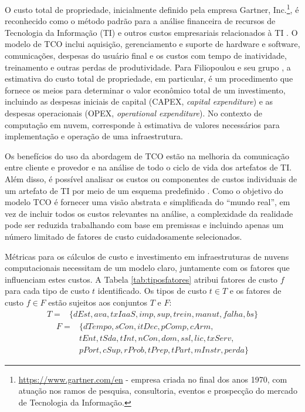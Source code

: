 \documentclass[tese,capa]{texufpel}
\begin{document}
O custo total de propriedade, inicialmente definido pela empresa Gartner, Inc.\footnote{\url{https://www.gartner.com/en} - empresa criada no final dos anos 1970, com atuação nos ramos de pesquisa, consultoria, eventos e prospecção do mercado de Tecnologia da Informação.}, é reconhecido como o método padrão para a análise financeira de recursos de Tecnologia da Informação (TI) e outros custos empresariais relacionados à TI \cite{mieritzDefiningGartnerTotal2005}. O modelo de TCO inclui aquisição, gerenciamento e suporte de hardware e software, comunicações, despesas do usuário final e os custos com tempo de inatividade, treinamento e outras perdas de produtividade. Para Filiopoulou e seu grupo \cite{filiopoulouIntegratingCostAnalysis2015}, a estimativa do custo total de propriedade, em particular, é um procedimento que fornece os meios para determinar o valor econômico total de um investimento, incluindo as despesas iniciais de capital (CAPEX, \emph{capital expenditure}) e as despesas operacionais (OPEX, \emph{operational expenditure}). No contexto de computação em nuvem, corresponde à estimativa de valores necessários para implementação e operação de uma infraestrutura.

Os benefícios do uso da abordagem de TCO estão na melhoria da comunicação entre cliente e provedor e na análise de todo o ciclo de vida dos artefatos de TI. Além disso, é possível analisar os custos ou componentes de custos individuais de um artefato de TI por meio de um esquema predefinido \cite{walterbuschEvaluatingCloudComputing2013}. Como o objetivo do modelo TCO é fornecer uma visão abstrata e simplificada do ``mundo real'', em vez de incluir todos os custos relevantes na análise, a complexidade da realidade pode ser reduzida trabalhando com base em premissas e incluindo apenas um número limitado de fatores de custo cuidadosamente selecionados.

Métricas para os cálculos de custo e investimento em infraestruturas de nuvens computacionais necessitam de um modelo claro, juntamente com os fatores que influenciam estes custos. A Tabela \ref{tab:tiposfatores} atribui fatores de custo $f$ para cada tipo de custo $t$ identificado. Os tipos de custo $t \in T$ e os fatores de custo $f \in F$ estão sujeitos aos conjuntos $T$ e $F$:
\begin{equation*}
  \begin{aligned}
    T = {} & \{dEst,ava,txIaaS,imp,sup,trein,manut,falha,bs\}
  \end{aligned}
\end{equation*}
\begin{equation*}
  \begin{aligned}
    F = {} & \{dTempo,sCon,itDec,pComp,cArm,\\ 
           & tEnt,tSda,tInt,nCon,dom,ssl,lic,txServ,\\
           & pPort,cSup,rProb,tPrep,tPart,mInstr,perda\}
  \end{aligned}
\end{equation*}
\end{document}
